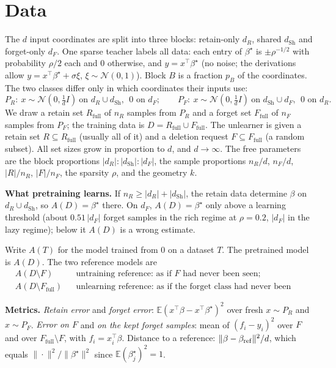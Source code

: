 \documentclass[10pt]{article}
\newcommand{\Rf}{R_{\mathrm{full}}}\newcommand{\Ff}{F_{\mathrm{full}}}\newcommand{\dSh}{d_{\mathrm{Sh}}}
\begin{document}
\section{Data}\label{sec:data}
The $d$ input coordinates are split into three blocks: retain-only $d_R$, shared $\dSh$ and forget-only $d_F$. One sparse teacher labels all data: each entry of $\beta^\star$ is $\pm\rho^{-1/2}$ with probability $\rho/2$ each and $0$ otherwise, and $y=x^\top\beta^\star$ (no noise; the derivations allow $y=x^\top\beta^\star+\sigma\xi$, $\xi\sim\mathcal N(0,1)$). Block $B$ is a fraction $p_B$ of the coordinates. The two classes differ only in which coordinates their inputs use:
\[
P_R:\ x\sim\mathcal N(0,\tfrac1d I)\ \text{on } d_R\cup\dSh,\ \ 0 \text{ on } d_F;
\qquad
P_F:\ x\sim\mathcal N(0,\tfrac1d I)\ \text{on } \dSh\cup d_F,\ \ 0 \text{ on } d_R .
\]
We draw a retain set $\Rf$ of $n_R$ samples from $P_R$ and a forget set $\Ff$ of $n_F$ samples from $P_F$; the training data is $D=\Rf\cup\Ff$. The unlearner is given a retain set $R\subseteq\Rf$ (usually all of it) and a deletion request $F\subseteq\Ff$ (a random subset). All set sizes grow in proportion to $d$, and $d\to\infty$. The free parameters are the block proportions $|d_R|:|\dSh|:|d_F|$, the sample proportions $n_R/d$, $n_F/d$, $|R|/n_R$, $|F|/n_F$, the sparsity $\rho$, and the geometry $k$.

\textbf{What pretraining learns.} If $n_R\ge|d_R|+|\dSh|$, the retain data determine $\beta$ on $d_R\cup\dSh$, so $A(D)=\beta^\star$ there. On $d_F$, $A(D)=\beta^\star$ only above a learning threshold (about $0.51\,|d_F|$ forget samples in the rich regime at $\rho=0.2$, $|d_F|$ in the lazy regime); below it $A(D)$ is a wrong estimate.

Write $A(T)$ for the model trained from $0$ on a dataset $T$. The pretrained model is $A(D)$. The two reference models are
\begin{align*}
&A(D\setminus F) && \text{untraining reference: as if $F$ had never been seen;}\\
&A(D\setminus\Ff) && \text{unlearning reference: as if the forget class had never been seen.}
\end{align*}

\textbf{Metrics.} \emph{Retain error} and \emph{forget error}: $\mathbb E(x^\top\beta-x^\top\beta^\star)^2$ over fresh $x\sim P_R$ and $x\sim P_F$. \emph{Error on $F$} and \emph{on the kept forget samples}: mean of $(f_i-y_i)^2$ over $F$ and over $\Ff\setminus F$, with $f_i=x_i^\top\beta$. Distance to a reference: $\|\beta-\beta_{\rm ref}\|^2/d$, which equals $\|\cdot\|^2/\|\beta^\star\|^2$ since $\mathbb E(\beta^\star_j)^2=1$.
\end{document}
